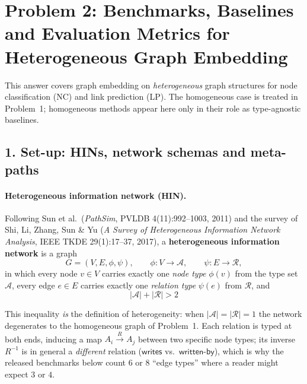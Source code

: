 \newcommand{\pTwoTgt}{orange!22}
\newcommand{\pTwoAgt}{blue!12}
\newcommand{\pTwoAtt}{green!14}
\newcommand{\pTwoVen}{purple!12}

\section*{Problem 2: Benchmarks, Baselines and Evaluation Metrics for
Heterogeneous Graph Embedding}

\noindent
This answer covers graph embedding on \emph{heterogeneous} graph structures for node
classification (NC) and link prediction (LP). The homogeneous case is treated in Problem~1;
homogeneous methods appear here only in their role as type-agnostic baselines.

\subsection*{1. Set-up: HINs, network schemas and meta-paths}

\paragraph{Heterogeneous information network (HIN).}
\begin{sloppypar}
Following Sun et al.\ (\emph{PathSim}, PVLDB 4(11):992--1003, 2011) and the survey of Shi, Li,
Zhang, Sun \& Yu (\emph{A Survey of Heterogeneous Information Network Analysis}, IEEE TKDE
29(1):17--37, 2017), a \textbf{heterogeneous information network} is a graph
\[
  G=(V,E,\phi,\psi),\qquad \phi:V\to\mathcal{A},\qquad \psi:E\to\mathcal{R},
\]
in which every node $v\in V$ carries exactly one \emph{node type} $\phi(v)$ from the type set
$\mathcal{A}$, every edge $e\in E$ carries exactly one \emph{relation type} $\psi(e)$ from
$\mathcal{R}$, and
\[
  \boxed{\;|\mathcal{A}|+|\mathcal{R}|>2\;}
\]
\end{sloppypar}
This inequality \emph{is} the definition of heterogeneity: when $|\mathcal{A}|=|\mathcal{R}|=1$
the network degenerates to the homogeneous graph of Problem~1. Each relation is typed at both
ends, inducing a map $A_i\xrightarrow{R}A_j$ between two specific node types; its inverse
$R^{-1}$ is in general a \emph{different} relation ($\mathsf{writes}$ vs.\ $\mathsf{written\text{-}by}$),
which is why the released benchmarks below count $6$ or $8$ ``edge types'' where a reader might
expect $3$ or $4$.

